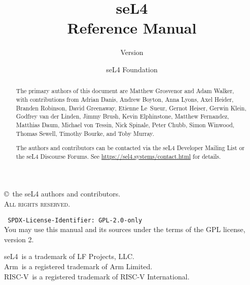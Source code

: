 \documentclass[english,a4paper,11pt,twoside]{report}
\date{}
\date{}
\newcommand{\version}{}
\newcommand{\rtm}{\textsuperscript{\textregistered}}
\begin{document}
  \title{seL4\\ Reference Manual}
  \subtitle{Version \version}

  \author{seL4 Foundation}
  \date{\commitdate}

  \maketitle

  \thispagestyle{empty}

  \vfill

  \parindent 0pt\parskip 6pt

  \copyright\ the seL4 authors and contributors.\\
  \textsc{All rights reserved}.

  \vspace{2ex}
  \texttt{%
  SPDX-License-Identifier: GPL-2.0-only
  }\\
  You may use this manual and its sources under the terms of the GPL license, version 2.

  \vspace{2ex}
  seL4\rtm\ is a trademark of LF Projects, LLC.\\
  Arm\rtm\ is a registered trademark of Arm Limited.\\
  RISC-V\rtm\ is a registered trademark of RISC-V International.

  \thispagestyle{empty}
  \vfill
  \renewcommand{\abstractname}{Acknowledgements}
  \begin{abstract}
The primary authors of this document are Matthew Grosvenor and Adam Walker,
with contributions from
Adrian Danis,
Andrew Boyton,
Anna Lyons,
Axel Heider,
Branden Robinson,
David Greenaway,
Etienne Le~Sueur,
Gernot Heiser,
Gerwin Klein,
Godfrey van der Linden,
Jimmy Brush,
Kevin Elphinstone,
Matthew Fernandez,
Matthias Daum,
Michael von Tessin,
Nick Spinale,
Peter Chubb,
Simon Winwood,
Thomas Sewell,
Timothy Bourke, and
Toby Murray.

The authors and contributors can be contacted via the seL4 Developer Mailing
List or the seL4 Discourse Forums. See \url{https://sel4.systems/contact.html}
for details.
  \end{abstract}
  \thispagestyle{empty}
\end{document}
